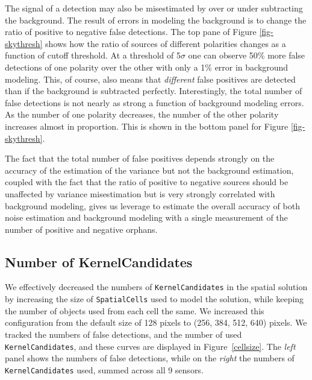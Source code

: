 \documentclass[prd, nofootinbib, floatfix, 11pt,tightenlines,times]{article}
\begin{document}

The signal of a detection may also be misestimated by over or under subtracting the background.  
The result of errors in modeling the background is to change the ratio of positive to negative
false detections.  The top pane of Figure \ref{fig-skythresh} shows how the ratio of sources of 
different polarities changes as a function of cutoff threshold.  At a threshold of 5$\sigma$
one can observe 50\% more false detections of one polarity over the other with only a 1\% error in background
modeling.  This, of course, also means that {\it different} false positives are detected than if the
background is subtracted perfectly.
Interestingly, the total number of false detections is not nearly as strong a function of background 
modeling errors.  As the number of one polarity decreases, the number of the other polarity increases
almost in proportion.  This is shown in the bottom panel for Figure \ref{fig-skythresh}.

The fact that the total number of false positives depends strongly on the accuracy of the estimation
of the variance but not the background estimation, coupled with the fact that the ratio of positive to 
negative sources should be unaffected by variance misestimation but is very strongly correlated with 
background modeling, gives us leverage to estimate the overall accuracy of both noise estimation and 
background modeling with a single measurement of the number of positive and negative orphans.



\subsection{Number of KernelCandidates}

We effectively decreased the numbers of {\tt KernelCandidates} in the
spatial solution by increasing the size of {\tt SpatialCells} used to
model the solution, while keeping the number of objects used from each
cell the same.  We increased this configuration from the default size
of 128 pixels to (256, 384, 512, 640) pixels.  We tracked the numbers
of false detections, and the number of used {\tt KernelCandidates},
and these curves are displayed in Figure~\ref{cellsize}.  The {\it
  left} panel shows the numbers of false detections, while on the {\it
  right} the numbers of {\tt KernelCandidates} used, summed across all
9 sensors.
\end{document}
